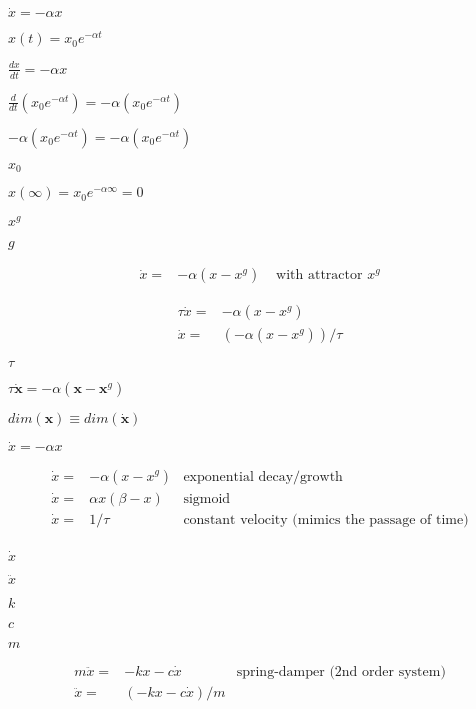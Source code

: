 \documentclass{article}
\begin{document}
$\dot{x} = -\alpha x$
\pagebreak

$x(t) = x_0e^{-\alpha t}$
\pagebreak

$\frac{dx}{dt} = -\alpha x$
\pagebreak

$\frac{d}{dt}(x_0e^{-\alpha t}) = -\alpha (x_0e^{-\alpha t})$
\pagebreak

$-\alpha(x_0e^{-\alpha t}) = -\alpha (x_0e^{-\alpha t})$
\pagebreak

$x_0$
\pagebreak

$x(\infty) = x_0e^{-\alpha\infty} = 0$
\pagebreak

$x^g$
\pagebreak

$g$
\pagebreak

\begin{eqnarray*} \dot{x} =& -\alpha(x-x^g) & \mbox{~with attractor } x^g \end{eqnarray*}
\pagebreak

\begin{eqnarray*} \tau\dot{x} =& -\alpha(x-x^g)\\ \dot{x} =& (-\alpha(x-x^g))/\tau \end{eqnarray*}
\pagebreak

$\tau$
\pagebreak

$\tau\dot{\mathbf{x}} = -\alpha(\mathbf{x}-\mathbf{x}^g)$
\pagebreak

$dim(\mathbf{x})\equiv dim(\dot{\mathbf{x}})$
\pagebreak

$ \dot{x} = -\alpha x$
\pagebreak

\begin{eqnarray*} \dot{x} =& -\alpha (x-x^g) & \mbox{exponential decay/growth} \label{equ_}\\ \dot{x} =& \alpha x (\beta-x) & \mbox{sigmoid} \label{equ_}\\ \dot{x} =& 1/\tau & \mbox{constant velocity (mimics the passage of time)} \label{equ_}\\ \end{eqnarray*}
\pagebreak

$ \dot{x} $
\pagebreak

$ \ddot{x} $
\pagebreak

$k$
\pagebreak

$c$
\pagebreak

$m$
\pagebreak

\begin{eqnarray*} m\ddot{x}=& -kx -c\dot{x} & \mbox{spring-damper (2nd order system)} \label{equ_}\\ \ddot{x}=& (-kx -c\dot{x})/m & \end{eqnarray*}
\pagebreak
\end{document}
